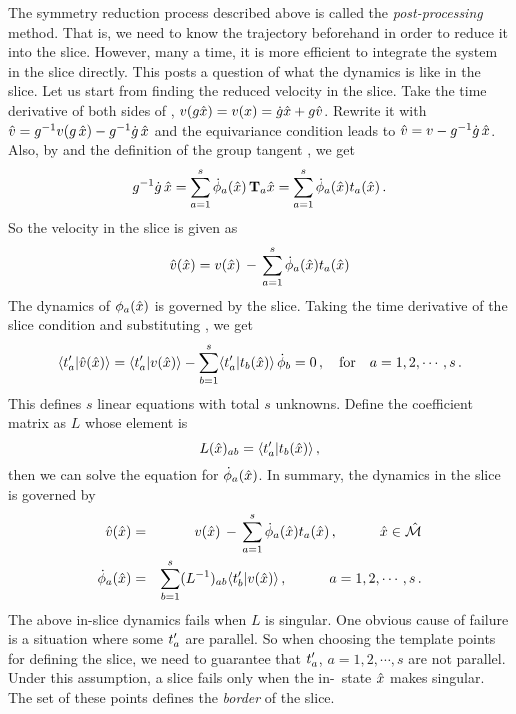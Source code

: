 The symmetry reduction process described above is called the \emph{post-processing}
method. That is, we need to know the trajectory beforehand in order to reduce
it into the slice. However, many a time, it is more efficient to integrate
the system in the slice directly. This posts a question of what the dynamics is
like in the slice. Let us start from finding the reduced velocity in the slice.
Take the time derivative of both sides of ,
$ v(g\hat{x}) = v(x) = \dot{g}\hat{x} + g\hat{v} $.
Rewrite it with $\hat{v} = g^{-1} v(g \, \hat{x})
- g^{-1} \dot{g} \, \hat{x}$ and the equivariance condition
 leads to
$\hat{v} = v - g^{-1} \dot{g} \, \hat{x} $.
Also,  by  and the definition of the group tangent , we
get
\[
  g^{-1} \dot{g}\, \hat{x}  = \sum_{a=1}^s \dot{{\bf \phi}}_a(\hat{x})
  \, \mathbf{T}_a \hat{x} =
  \sum_{a=1}^s \dot{{\bf \phi}}_a(\hat{x}) t_a(\hat{x})
  \,.
\]
So the velocity in the slice is given as
\begin{equation}
  \hat{v}(\hat{x})
  = v(\hat{x})
  \,-\, \sum_{a=1}^s \dot{{\bf \phi}}_a(\hat{x}) t_a(\hat{x})
  \label{eq:svel}
\end{equation}
The dynamics of ${\bf \phi}_a(\hat{x})$
is governed by the slice. Taking the time derivative of the slice condition
 and substituting , we get
\[
  \braket{\sliceTan{a}}{\velRed(\sspRed)} =
  \braket{\sliceTan{a}} {\vel(\sspRed)} -
  \sum_{b=1}^s \braket{\sliceTan{a}}{\groupTan_b(\sspRed)} \, \dot{\gSpace}_b
  = 0
  \,, \quad
  \text{for} \quad a = 1, 2,\cdots, s
  \,.
\]
This defines $s$ linear equations with total $s$ unknowns. Define the
coefficient matrix as $L$ whose element is
\begin{equation}
  \label{eq:phiL}
  L(\sspRed)_{ab} =  \braket{\sliceTan{a}}{\groupTan_b(\sspRed)}
  \,,
\end{equation}
then we can solve the equation for $\dot{{\bf \phi}}_a(\hat{x})$.
In summary, the dynamics in the slice is governed by
\begin{eqnarray}
  \velRed(\sspRed)
  & = & \vel(\sspRed)
        \,-\, \sum_{a=1}^s \dot{\gSpace}_a(\sspRed) \groupTan_a(\sspRed)
        \,,\qquad\quad \sspRed \in \pSRed
        \label{EqMotMFrame0} \\
  \dot{\gSpace}_a(\sspRed)
  & = &  \sum_{b=1}^{s}(L^{-1})_{ab} \braket{\sliceTan{b}}{\vel(\sspRed)}
        \,,\qquad\quad a = 1, 2, \cdots, s
        \label{MFdtheta0}
        \,.
\end{eqnarray}
The above in-slice dynamics fails when $L$ is singular. One obvious cause of
failure is a situation where some $t'_{a}$ are parallel. So when
choosing the template points for defining the slice, we need to guarantee
that $t'_{a}$, $a=1, 2, \cdots, s$ are not parallel. Under this
assumption, a slice fails only when the in-\slice\ state $\hat{x}$
makes  singular. The set of these points defines the
\emph{border} of the slice.

